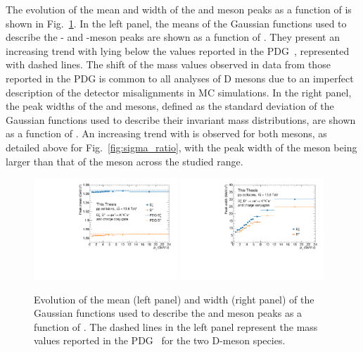 The evolution of the mean and width of the \ds and \dpl meson peaks as a function of \pt is shown in Fig.~\ref{fig:mean_width}. In the left panel, the means of the Gaussian functions used to describe the \ds- and \dpl-meson peaks are shown as a function of \pt. They present an increasing trend with \pt lying below the values reported in the PDG~\cite{pdg}, represented with dashed lines. The shift of the mass values observed in data from those reported in the PDG is common to all analyses of D mesons due to an imperfect description of the detector misalignments in MC simulations. In the right panel, the peak widths of the \ds and \dpl mesons, defined as the standard deviation of the Gaussian functions used to describe their invariant mass distributions, are shown as a function of \pt. An increasing trend with \pt is observed for both mesons, as detailed above for Fig.~\ref{fig:sigma_ratio}, with the peak width of the \ds meson being larger than that of the \dpl meson across the studied \pt range.

\begin{figure}[htb]
    \centering
    \includegraphics[width=0.48\textwidth]{Figures/Chapter 5/Mean.pdf}
    \includegraphics[width=0.48\textwidth]{Figures/Chapter 5/Sigma.pdf}
    \caption{Evolution of the mean (left panel) and width (right panel) of the Gaussian functions used to describe the \ds and \dpl meson peaks as a function of \pt. The dashed lines in the left panel represent the mass values reported in the PDG~\cite{pdg} for the two D-meson species.}
    \label{fig:mean_width}
\end{figure}

